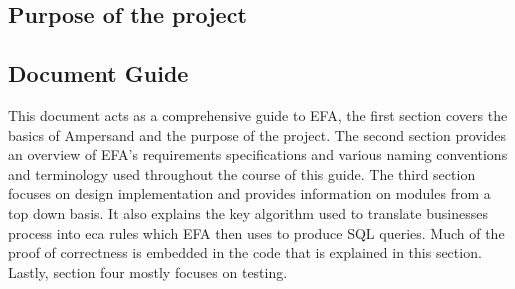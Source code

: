 \documentclass[journal,12pt,onecolumn,draftclsnofoot]{article}
\let\Oldsubsection\subsection
\renewcommand{\subsection}{\FloatBarrier\Oldsubsection}
\begin{document}
\subsection{Purpose of the project}
\subsection{Document Guide}
This document acts as a comprehensive guide to EFA, the first section covers 
the basics of Ampersand and the purpose of the project. The second section 
provides an overview of EFA's requirements specifications and various naming 
conventions and terminology used throughout the course of this guide. The third 
section focuses on design implementation and provides information on modules 
from a top down basis. It also explains the key algorithm used to translate 
businesses process into eca rules which EFA then uses to produce SQL queries. 
Much of the proof of correctness is embedded in the code that is explained in 
this section. Lastly, section four mostly focuses on testing. 


\end{document}
